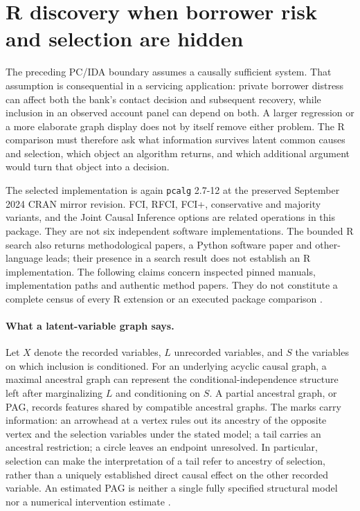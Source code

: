 \section{R discovery when borrower risk and selection are hidden}
\label{exec13:latent-r}

The preceding PC/IDA boundary assumes a causally sufficient system. That
assumption is consequential in a servicing application: private borrower
distress can affect both the bank's contact decision and subsequent recovery,
while inclusion in an observed account panel can depend on both. A larger
regression or a more elaborate graph display does not by itself remove either
problem. The R comparison must therefore ask what information survives latent
common causes and selection, which object an algorithm returns, and which
additional argument would turn that object into a decision.

The selected implementation is again \texttt{pcalg} 2.7-12 at the preserved
September 2024 CRAN mirror revision. FCI, RFCI, FCI+, conservative and majority
variants, and the Joint Causal Inference options are related operations in
this package. They are not six independent software implementations. The
bounded R search also returns methodological papers, a Python software paper
and other-language leads; their presence in a search result does not establish
an R implementation. The following claims concern inspected pinned manuals,
implementation paths and authentic method papers. They do not constitute a
complete census of every R extension or an executed package comparison
\citep{exec13_latentr_primary}.

\paragraph{What a latent-variable graph says.}
Let $X$ denote the recorded variables, $L$ unrecorded variables, and $S$ the
variables on which inclusion is conditioned. For an underlying acyclic causal
graph, a maximal ancestral graph can represent the conditional-independence
structure left after marginalizing $L$ and conditioning on $S$. A partial
ancestral graph, or PAG, records features shared by compatible ancestral
graphs. The marks carry information: an arrowhead at a vertex rules out its
ancestry of the opposite vertex and the selection variables under the stated
model; a tail carries an ancestral restriction; a circle leaves an endpoint
unresolved. In particular, selection can make the interpretation of a tail
refer to ancestry of selection, rather than a uniquely established direct
causal effect on the other recorded variable. An estimated PAG is neither a
single fully specified structural model nor a numerical intervention estimate
\citep{exec13_latentr_primary,exec13_latentr_colombo2012}.

